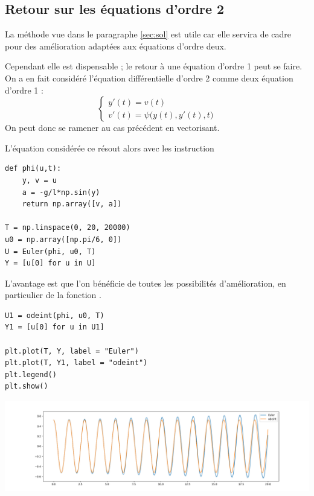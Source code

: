 \newpage
\subsection{Retour sur les équations d'ordre 2}
La méthode vue dans le paragraphe \ref{sec:sol} est utile car elle servira de cadre pour des amélioration adaptées aux équations d'ordre deux.

Cependant elle est dispensable ; le retour à une équation d'ordre 1 peut se faire. On a en fait considéré l'équation différentielle d'ordre 2 comme deux équation d'ordre 1 : \[\left\{\begin{matrix} y'(t) = v(t)\\ v'(t) = \psi\bigl(y(t), y'(t), t\bigr)\end{matrix}\right.\]
On peut donc se ramener au cas précédent en vectorisant.

L'équation considérée ce résout alors avec les instruction
\begin{lstlisting}
def phi(u,t):
    y, v = u
    a = -g/l*np.sin(y)
    return np.array([v, a])
    
T = np.linspace(0, 20, 20000)   
u0 = np.array([np.pi/6, 0])
U = Euler(phi, u0, T)
Y = [u[0] for u in U]
\end{lstlisting}


L'avantage est que l'on bénéficie de toutes les possibilités d'amélioration, en particulier de la fonction .
\begin{lstlisting}
U1 = odeint(phi, u0, T)
Y1 = [u[0] for u in U1]

plt.plot(T, Y, label = "Euler")
plt.plot(T, Y1, label = "odeint")
plt.legend()
plt.show()
\end{lstlisting}
\begin{center}
\includegraphics[width=14cm]{Cours/Images/ED2_pendule4.png}
\end{center}
